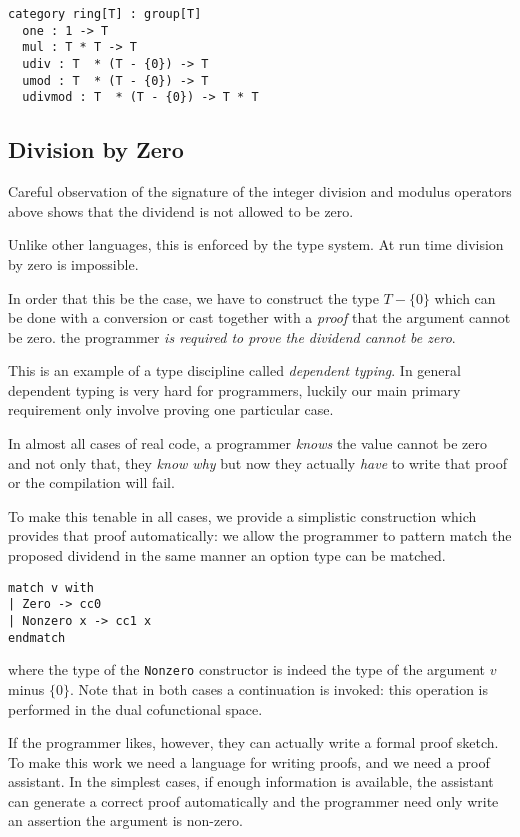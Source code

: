 \documentclass[oneside]{book}
\theoremstyle{plain}
\theoremstyle{definition}
\theoremstyle{plain}
\begin{document}
\begin{verbatim}
category ring[T] : group[T]
  one : 1 -> T
  mul : T * T -> T
  udiv : T  * (T - {0}) -> T
  umod : T  * (T - {0}) -> T
  udivmod : T  * (T - {0}) -> T * T
\end{verbatim}

\subsection{Division by Zero}
Careful observation of the signature of the integer division and modulus
operators above shows that the dividend is not allowed to be zero.

Unlike other languages, this is enforced by the type system. At run time
division by zero is impossible.

In order that this be the case, we have to construct the type $T-\{0\}$
which can be done with a conversion or cast together with a {\em proof}
that the argument cannot be zero. the programmer {\em is required to prove
the dividend cannot be zero}.

This is an example of a type discipline called {\em dependent typing}.
In general dependent typing is very hard for programmers, luckily our
main primary requirement only involve proving one particular case.

In almost all cases of real code, a programmer {\em knows} the value
cannot be zero and not only that, they {\em know why} but now they
actually {\em have} to write that proof or the compilation will fail.

To make this tenable in all cases, we provide a simplistic construction
which provides that proof automatically: we allow the programmer
to pattern match the proposed dividend in the same manner an option
type can be matched.
\begin{verbatim}
match v with
| Zero -> cc0 
| Nonzero x -> cc1 x
endmatch
\end{verbatim}
where the type of the \verb$Nonzero$ constructor is indeed the type of
the argument $v$ minus $\{0\}$. Note that in both cases a continuation
is invoked: this operation is performed in the dual cofunctional space.

If the programmer likes, however, they can actually write a formal proof
sketch. To make this work we need a language for writing proofs, and
we need a proof assistant. In the simplest cases, if enough information
is available, the assistant can generate a correct proof automatically
and the programmer need only write an assertion the argument is
non-zero.
\end{document}
